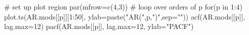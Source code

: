 \begin{Schunk}
\begin{Sinput}
 # set up plot region
 par(mfrow=c(4,3))
 # loop over orders of p
 for(p in 1:4) {
   plot.ts(AR.mods[[p]][1:50],
           ylab=paste("AR(",p,")",sep=""))
   acf(AR.mods[[p]], lag.max=12)
   pacf(AR.mods[[p]], lag.max=12, ylab="PACF")
 }
\end{Sinput}
\end{Schunk}
